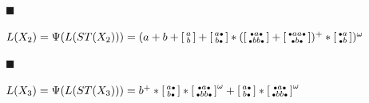 \documentclass[10pt,a4paper]{article}
\begin{document}
\par\noindent  $\blacksquare$ 
 
$L(X_{2})=\Psi(L(ST(X_{2})))=(a+b+\left[\begin{smallmatrix}a\\
b\end{smallmatrix}\right]+\left[\begin{smallmatrix}a\vbox{\hbox{\tiny$\bullet$}}\\
b\vbox{\hbox{\tiny$\bullet$}}\end{smallmatrix}\right]*(\left[\begin{smallmatrix}\vbox{\hbox{\tiny$\bullet$}}a\vbox{\hbox{\tiny$\bullet$}}\\
\vbox{\hbox{\tiny$\bullet$}}bb\vbox{\hbox{\tiny$\bullet$}}\end{smallmatrix}\right]+\left[\begin{smallmatrix}\vbox{\hbox{\tiny$\bullet$}}aa\vbox{\hbox{\tiny$\bullet$}}\\
\vbox{\hbox{\tiny$\bullet$}}b\vbox{\hbox{\tiny$\bullet$}}\end{smallmatrix}\right])^{+}*\left[\begin{smallmatrix}\vbox{\hbox{\tiny$\bullet$}}a\\
\vbox{\hbox{\tiny$\bullet$}}b\end{smallmatrix}\right])^{\omega}$\par
 
 
 
\par\noindent  $\blacksquare$ 
 
$L(X_{3})=\Psi(L(ST(X_{3})))=b^{+}*\left[\begin{smallmatrix}a\vbox{\hbox{\tiny$\bullet$}}\\
b\vbox{\hbox{\tiny$\bullet$}}\end{smallmatrix}\right]*\left[\begin{smallmatrix}\vbox{\hbox{\tiny$\bullet$}}a\vbox{\hbox{\tiny$\bullet$}}\\
\vbox{\hbox{\tiny$\bullet$}}bb\vbox{\hbox{\tiny$\bullet$}}\end{smallmatrix}\right]^{\omega}+\left[\begin{smallmatrix}a\vbox{\hbox{\tiny$\bullet$}}\\
b\vbox{\hbox{\tiny$\bullet$}}\end{smallmatrix}\right]*\left[\begin{smallmatrix}\vbox{\hbox{\tiny$\bullet$}}a\vbox{\hbox{\tiny$\bullet$}}\\
\vbox{\hbox{\tiny$\bullet$}}bb\vbox{\hbox{\tiny$\bullet$}}\end{smallmatrix}\right]^{\omega}$\par
 
\end{document}
